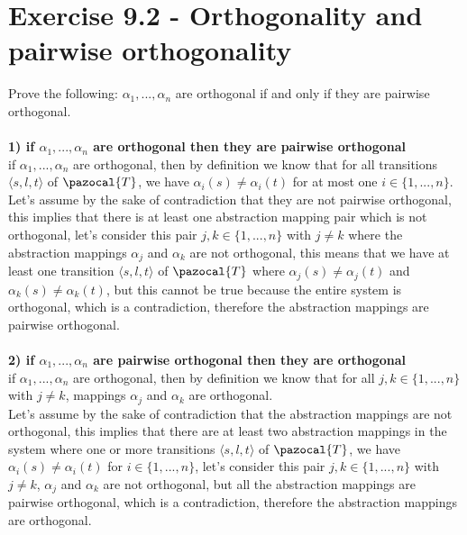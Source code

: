\documentclass[11pt,a4paper]{article}
\begin{document}
\section*{Exercise 9.2 - Orthogonality and pairwise orthogonality}
Prove the following: $\alpha_1, ..., \alpha_n$ are orthogonal if and only if they are pairwise orthogonal.\\\\
\textbf{1) if $\alpha_1, ..., \alpha_n$ are orthogonal then they are pairwise orthogonal}\\
if $\alpha_1, ..., \alpha_n$ are orthogonal, then by definition we know that for all transitions $\langle s, l, t\rangle$ of $\pazocal{T}$, we have $\alpha_i(s) \neq \alpha_i(t)$  for at most one $i \in \{1, ... , n\}$. \\
Let's assume by the sake of contradiction that they are not pairwise orthogonal, this implies that there is at least one abstraction mapping pair which is not orthogonal, let's consider this pair $j,k \in \{1,...,n\}$ with $j \neq k$ where the abstraction mappings $\alpha_j$ and $\alpha_k$ are not orthogonal, this means that we have at least one transition $\langle s, l, t \rangle$ of $\pazocal{T}$ where $\alpha_j(s) \neq \alpha_j(t)$ and $\alpha_k(s) \neq \alpha_k(t)$, but this cannot be true because the entire system is orthogonal, which is a contradiction, therefore the abstraction mappings are pairwise orthogonal.\\\\
\textbf{2) if $\alpha_1, ..., \alpha_n$ are pairwise orthogonal then they are orthogonal}\\
if $\alpha_1, ..., \alpha_n$ are orthogonal, then by definition we know that for all $j, k \in \{1, ... , n\}$ with $j \neq k$, mappings $\alpha_j$ and $\alpha_k$ are orthogonal.\\
Let's assume by the sake of contradiction that the abstraction mappings are not orthogonal, this implies that there are at least two abstraction mappings in the system where one or more transitions $\langle s, l, t \rangle$ of $\pazocal{T}$, we have $\alpha_i(s) \neq \alpha_i(t)$  for $i \in \{1, ... , n\}$, let's consider this pair $j,k \in \{1,...,n\}$ with $j \neq k$, $\alpha_j$ and $\alpha_k$ are not orthogonal, but all the abstraction mappings are pairwise orthogonal, which is a contradiction, therefore the abstraction mappings are orthogonal.\\
\end{document}
